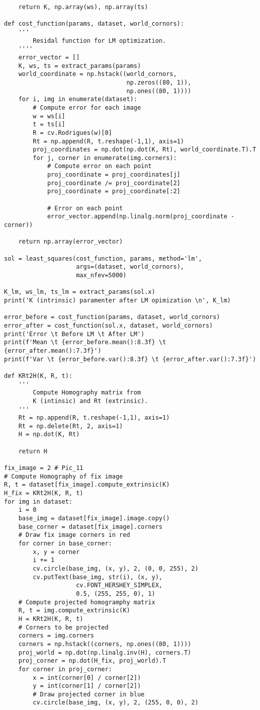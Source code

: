 \documentclass[11pt]{article}
\begin{document}
\begin{lstlisting}
    return K, np.array(ws), np.array(ts)

def cost_function(params, dataset, world_cornors):
    '''
        Residal function for LM optimization.
    ''''
    error_vector = []
    K, ws, ts = extract_params(params)
    world_coordinate = np.hstack((world_cornors, 
                                  np.zeros((80, 1)), 
                                  np.ones((80, 1)))) 
    for i, img in enumerate(dataset):
        # Compute error for each image
        w = ws[i]
        t = ts[i]
        R = cv.Rodrigues(w)[0]
        Rt = np.append(R, t.reshape(-1,1), axis=1) 
        proj_coordinates = np.dot(np.dot(K, Rt), world_coordinate.T).T
        for j, corner in enumerate(img.corners):
            # Compute error on each point
            proj_coordinate = proj_coordinates[j]
            proj_coordinate /= proj_coordinate[2]
            proj_coordinate = proj_coordinate[:2]
        
            # Error on each point
            error_vector.append(np.linalg.norm(proj_coordinate - corner))

    return np.array(error_vector)

sol = least_squares(cost_function, params, method='lm', 
                    args=(dataset, world_cornors),
                    max_nfev=5000)

K_lm, ws_lm, ts_lm = extract_params(sol.x)
print('K (intrinsic) paramenter after LM opimization \n', K_lm)

error_before = cost_function(params, dataset, world_cornors)
error_after = cost_function(sol.x, dataset, world_cornors)
print('Error \t Before LM \t After LM')
print(f'Mean \t {error_before.mean():8.3f} \t {error_after.mean():7.3f}')
print(f'Var \t {error_before.var():8.3f} \t {error_after.var():7.3f}')

def KRt2H(K, R, t):
    '''
        Compute Homography matrix from
        K (intinsic) and Rt (extrinsic).
    '''
    Rt = np.append(R, t.reshape(-1,1), axis=1)
    Rt = np.delete(Rt, 2, axis=1)
    H = np.dot(K, Rt)

    return H

fix_image = 2 # Pic_11
# Compute Homography of fix image
R, t = dataset[fix_image].compute_extrinsic(K)
H_fix = KRt2H(K, R, t)
for img in dataset:
    i = 0
    base_img = dataset[fix_image].image.copy()
    base_corner = dataset[fix_image].corners
    # Draw fix image corners in red
    for corner in base_corner:
        x, y = corner
        i += 1
        cv.circle(base_img, (x, y), 2, (0, 0, 255), 2)
        cv.putText(base_img, str(i), (x, y), 
                    cv.FONT_HERSHEY_SIMPLEX, 
                    0.5, (255, 255, 0), 1)
    # Compute projected homogramphy matrix
    R, t = img.compute_extrinsic(K)
    H = KRt2H(K, R, t)
    # Corners to be projected
    corners = img.corners
    corners = np.hstack((corners, np.ones((80, 1))))
    proj_world = np.dot(np.linalg.inv(H), corners.T)
    proj_corner = np.dot(H_fix, proj_world).T
    for corner in proj_corner:
        x = int(corner[0] / corner[2])
        y = int(corner[1] / corner[2])
        # Draw projected corner in blue
        cv.circle(base_img, (x, y), 2, (255, 0, 0), 2)


\end{lstlisting}
\end{document}
